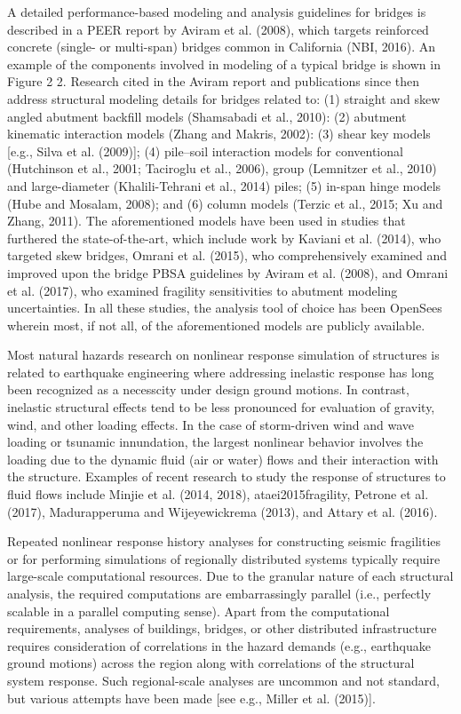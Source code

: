 A detailed performance-based modeling and analysis guidelines for bridges is described in a PEER report by Aviram et al. (2008), which targets reinforced concrete (single- or multi-span) bridges common in California (NBI, 2016). An example of the components involved in modeling of a typical bridge is shown in Figure 2 2. Research cited in the Aviram report and publications since then address structural modeling details for bridges related to: (1) straight and skew angled abutment backfill models (Shamsabadi et al., 2010): (2) abutment kinematic interaction models (Zhang and Makris, 2002): (3) shear key models [e.g., Silva et al. (2009)]; (4) pile–soil interaction models for conventional (Hutchinson et al., 2001; Taciroglu et al., 2006), group (Lemnitzer et al., 2010) and large-diameter (Khalili-Tehrani et al., 2014) piles; (5) in-span hinge models (Hube and Mosalam, 2008); and (6) column models (Terzic et al., 2015; Xu and Zhang, 2011). The aforementioned models have been used in studies that furthered the state-of-the-art, which include work by Kaviani et al. (2014), who targeted skew bridges, Omrani et al. (2015), who comprehensively examined and improved upon the bridge PBSA guidelines by Aviram et al. (2008), and Omrani et al. (2017), who examined fragility sensitivities to abutment modeling uncertainties. In all these studies, the analysis tool of choice has been OpenSees \citep{mckenna2011opensees} wherein most, if not all, of the aforementioned models are publicly available. 

Most natural hazards research on nonlinear response simulation of structures is related to earthquake engineering where addressing inelastic response has long been recognized as a necesscity under design ground motions. In contrast, inelastic structural effects tend to be less pronounced for evaluation of gravity, wind, and other loading effects. In the case of storm-driven wind and wave loading or tsunamic innundation, the largest nonlinear behavior involves the loading due to the dynamic fluid (air or water) flows and their interaction with the structure. Examples of recent research to study the response of structures to fluid flows include Minjie et al. (2014, 2018), ataei2015fragility, Petrone et al. (2017), Madurapperuma and Wijeyewickrema (2013), and Attary et al. (2016).

Repeated nonlinear response history analyses for constructing seismic fragilities or for performing simulations of regionally distributed systems typically require large-scale computational resources. Due to the granular nature of each structural analysis, the required computations are embarrassingly parallel (i.e., perfectly scalable in a parallel computing sense). Apart from the computational requirements, analyses of buildings, bridges, or other distributed infrastructure requires consideration of correlations in the hazard demands (e.g., earthquake ground motions) across the region along with correlations of the structural system response. Such regional-scale analyses are uncommon and not standard, but various attempts have been made [see e.g., Miller et al. (2015)].


